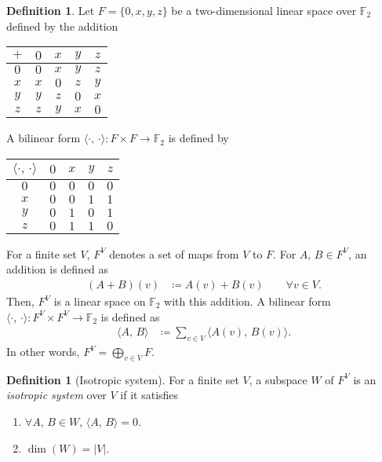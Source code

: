 \documentclass[twoside,10pt]{article}
\theoremstyle{definition}
\newtheorem{definition}[theorem]{Definition}
\theoremstyle{remark}
\begin{document}
\begin{definition}
Let $F=\{0,x,y,z\}$ be a two-dimensional linear space over $\mathbb{F}_2$ defined by the addition
\begin{table}[h]
\centering
\begin{tabular}{|c|cccc|}
\hline
$+$&$0$&$x$&$y$&$z$\\
\hline
$0$&$0$&$x$&$y$&$z$\\
$x$&$x$&$0$&$z$&$y$\\
$y$&$y$&$z$&$0$&$x$\\
$z$&$z$&$y$&$x$&$0$\\
\hline
\end{tabular}
\end{table}

A bilinear form $\langle\cdot,\,\cdot\rangle\colon F\times F\to\mathbb{F}_2$ is defined by
\begin{table}[h]
\centering
\begin{tabular}{|c|cccc|}
\hline
$\langle\cdot,\,\cdot\rangle$&$0$&$x$&$y$&$z$\\
\hline
$0$&$0$&$0$&$0$&$0$\\
$x$&$0$&$0$&$1$&$1$\\
$y$&$0$&$1$&$0$&$1$\\
$z$&$0$&$1$&$1$&$0$\\
\hline
\end{tabular}
\end{table}

For a finite set $V$, $F^V$ denotes a set of maps from $V$ to $F$.
For $A,\, B\in F^V$, an addition is defined as
\begin{align*}
(A+B)(v)&\coloneq A(v) + B(v)\qquad\forall v\in V.
\end{align*}
Then, $F^V$ is a linear space on $\mathbb{F}_2$ with this addition.
A bilinear form $\langle\cdot,\,\cdot\rangle\colon F^V\times F^V\to\mathbb{F}_2$ is defined as
\begin{align*}
\langle A,\,B\rangle &\coloneqq \sum_{v\in V} \langle A(v),\,B(v)\rangle.
\end{align*}
In other words, $F^V = \bigoplus_{v\in V}F$.
\end{definition}

\begin{definition}[Isotropic system]
For a finite set $V$, a subspace $W$ of $F^V$ is an \textit{isotropic system} over $V$ if it satisfies
\begin{enumerate}
\item $\forall A,\,B\in W$, $\langle A,\,B\rangle = 0$.
\item $\dim(W) = |V|$.
\end{enumerate}
\end{definition}
\end{document}
